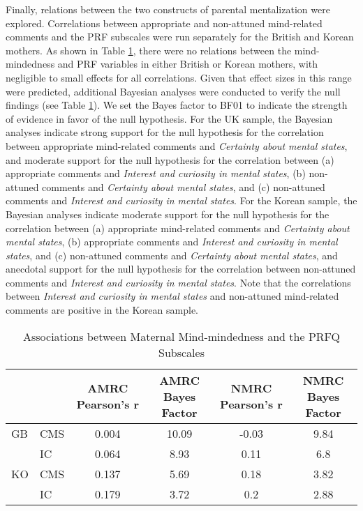 \documentclass[
]{article}
\begin{document}
Finally, relations between the two constructs of parental mentalization were explored. Correlations between appropriate and non-attuned mind-related comments and the PRF subscales were run separately for the British and Korean mothers. As shown in Table \ref{tab:table3}, there were no relations between the mind-mindedness and PRF variables in either British or Korean mothers, with negligible to small effects for all correlations. Given that effect sizes in this range were predicted, additional Bayesian analyses were conducted to verify the null findings (see Table \ref{tab:table3}). We set the Bayes factor to BF01 to indicate the strength of evidence in favor of the null hypothesis. For the UK sample, the Bayesian analyses indicate strong support for the null hypothesis for the correlation between appropriate mind-related comments and \emph{Certainty about mental states}, and moderate support for the null hypothesis for the correlation between (a) appropriate comments and \emph{Interest and curiosity in mental states}, (b) non-attuned comments and \emph{Certainty about mental states}, and (c) non-attuned comments and \emph{Interest and curiosity in mental states}. For the Korean sample, the Bayesian analyses indicate moderate support for the null hypothesis for the correlation between (a) appropriate mind-related comments and \emph{Certainty about mental states}, (b) appropriate comments and \emph{Interest and curiosity in mental states}, and (c) non-attuned comments and \emph{Certainty about mental states}, and anecdotal support for the null hypothesis for the correlation between non-attuned comments and \emph{Interest and curiosity in mental states}. Note that the correlations between \emph{Interest and curiosity in mental states} and non-attuned mind-related comments are positive in the Korean sample.

\begin{table}[H]

\caption{\label{tab:table3}Associations between Maternal Mind-mindedness and the PRFQ Subscales}
\centering
\fontsize{9}{11}\selectfont
\begin{tabular}[t]{llcccc}
\toprule
\textbf{ } & \textbf{  } & \textbf{AMRC Pearson's r} & \textbf{AMRC Bayes Factor} & \textbf{NMRC Pearson's r} & \textbf{NMRC Bayes Factor}\\
\midrule
GB & CMS & 0.004 & 10.09 & -0.03 & 9.84\\
 & IC & 0.064 & 8.93 & 0.11 & 6.8\\
KO & CMS & 0.137 & 5.69 & 0.18 & 3.82\\
 & IC & 0.179 & 3.72 & 0.2 & 2.88\\
\bottomrule
\end{tabular}
\end{table}
\end{document}
